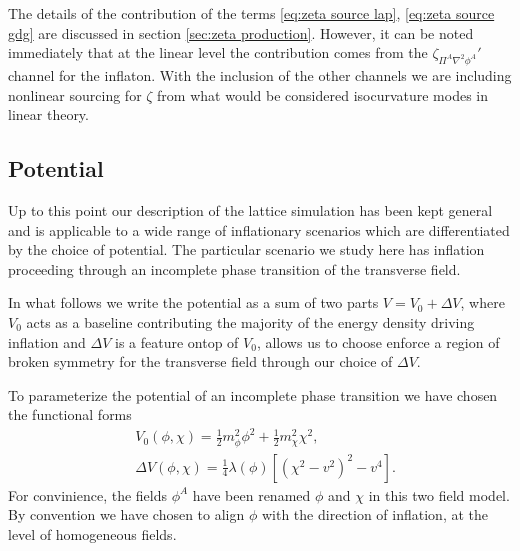The details of the contribution of the terms \eqref{eq:zeta source lap}, \eqref{eq:zeta source gdg} are discussed in section \ref{sec:zeta production}. However, it can be noted immediately that at the linear level the contribution comes from the $\zeta_{\Pi^A\nabla^2\phi^A}'$ channel for the inflaton. With the inclusion of the  other channels we are including nonlinear sourcing for $\zeta$ from what would be considered isocurvature modes in linear theory.



\subsection{Potential} \label{sec:potential}
Up to this point our description of the lattice simulation has been kept general and is applicable to a wide range of inflationary scenarios which are differentiated by the choice of potential. The particular scenario we study here has inflation proceeding through an incomplete phase transition of the transverse field. 

In what follows we write the potential as a sum of two parts $V = V_0 + \Delta V$, where $V_0$ acts as a baseline contributing the majority of the energy density driving inflation and $\Delta V$ is a feature ontop of $V_0$, allows us to choose enforce a region of broken symmetry for the transverse field through our choice of $\Delta V$.

To parameterize the potential of an incomplete phase transition we have chosen the functional forms
\begin{align}
  &V_0(\phi,\chi) = \frac{1}{2}m^2_\phi\phi^2 + \frac{1}{2}m^2_\chi\chi^2, \label{eq:V0} \\
  &\Delta V(\phi,\chi) = \frac{1}{4}\lambda(\phi)\left[ (\chi^2-v^2)^2 - v^4 \right]. \label{eq:DeltaV}
\end{align}
For convinience, the fields $\phi^A$ have been renamed $\phi$ and $\chi$ in this two field model. By convention we have chosen to align $\phi$ with the direction of inflation, at the level of homogeneous fields.

